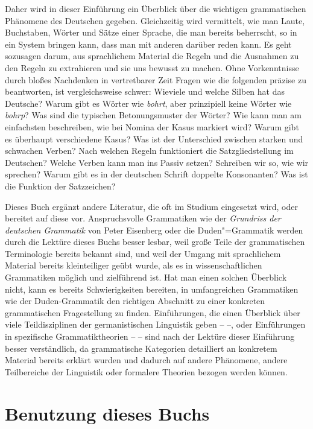 Daher wird in dieser Einführung ein Überblick über die wichtigen grammatischen Phänomene des Deutschen gegeben.
Gleichzeitig wird vermittelt, wie man Laute, Buchstaben, Wörter und Sätze einer Sprache, die man bereits beherrscht, so in ein System bringen kann, dass man mit anderen darüber reden kann.
Es geht sozusagen darum, aus sprachlichem Material die Regeln und die Ausnahmen zu den Regeln zu extrahieren und sie uns bewusst zu machen.
Ohne Vorkenntnisse durch bloßes Nachdenken in vertretbarer Zeit Fragen wie die folgenden präzise zu beantworten, ist vergleichsweise schwer:
Wieviele und welche Silben hat das Deutsche?
Warum gibt es Wörter wie \textit{bohrt}, aber prinzipiell keine Wörter wie \textit{bohrp}?
Was sind die typischen Betonungsmuster der Wörter?
Wie kann man am einfachsten beschreiben, wie bei Nomina der Kasus markiert wird?
Warum gibt es überhaupt verschiedene Kasus?
Was ist der Unterschied zwischen starken und schwachen Verben?
Nach welchen Regeln funktioniert die Satzgliedstellung im Deutschen?
Welche Verben kann man ins Passiv setzen?
Schreiben wir so, wie wir sprechen?
Warum gibt es in der deutschen Schrift doppelte Konsonanten?
Was ist die Funktion der Satzzeichen?

Dieses Buch ergänzt andere Literatur, die oft im Studium eingesetzt wird, oder bereitet auf diese vor.
Anspruchsvolle Grammatiken wie der \textit{Grundriss der deutschen Grammatik} von Peter Eisenberg \citep{Eisenberg2013a,Eisenberg2013b} oder die Duden"=Grammatik \citep{Duden8} werden durch die Lektüre dieses Buchs besser lesbar, weil große Teile der grammatischen Terminologie bereits bekannt sind, und weil der Umgang mit sprachlichem Material bereits kleinteiliger geübt wurde, als es in wissenschaftlichen Grammatiken möglich und zielführend ist.
Hat man einen solchen Überblick nicht, kann es bereits Schwierigkeiten bereiten, in umfangreichen Grammatiken wie der Duden-Grammatik den richtigen Abschnitt zu einer konkreten grammatischen Fragestellung zu finden.
Einführungen, die einen Überblick über viele Teildisziplinen der germanistischen Linguistik geben -- \zB \citet{MeibauerEa2015, SteinbachEa2007} --, oder Einführungen in spezifische Grammatiktheorien -- \zB \citet{Grewendorf2002, Mueller2008, Sternefeld2008, Sternefeld2009} -- sind nach der Lektüre dieser Einführung besser verständlich, da grammatische Kategorien detailliert an konkretem Material bereits erklärt wurden und dadurch auf andere Phänomene, andere Teilbereiche der Linguistik oder formalere Theorien bezogen werden können.

\section*{Benutzung dieses Buchs}
\label{sec:benutzungdiesesbuchs}

